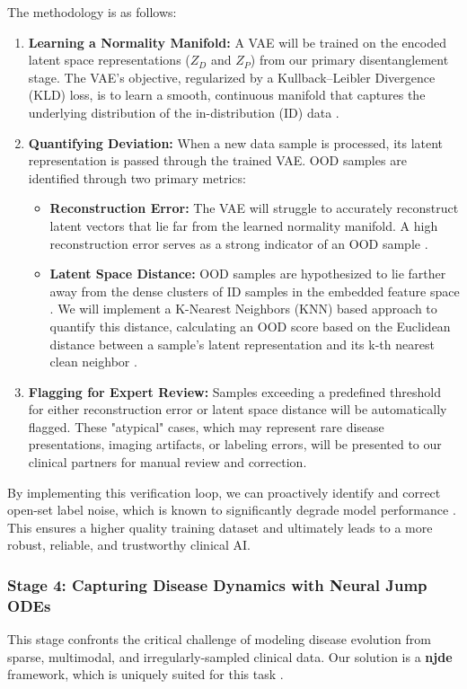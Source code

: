 \documentclass[11pt, a4paper]{article}
\begin{document}
The methodology is as follows:
\begin{enumerate}
    \item \textbf{Learning a Normality Manifold:} A VAE will be trained on the encoded latent space representations ($Z_D$ and $Z_P$) from our primary disentanglement stage. The VAE's objective, regularized by a Kullback–Leibler Divergence (KLD) loss, is to learn a smooth, continuous manifold that captures the underlying distribution of the in-distribution (ID) data \cite{YuanStojanovski2025,ZhouZhou2025}.
    \item \textbf{Quantifying Deviation:} When a new data sample is processed, its latent representation is passed through the trained VAE. OOD samples are identified through two primary metrics:
    \begin{itemize}
        \item \textbf{Reconstruction Error:} The VAE will struggle to accurately reconstruct latent vectors that lie far from the learned normality manifold. A high reconstruction error serves as a strong indicator of an OOD sample \cite{BiHuang2025,ZhangGe2025}.
        \item \textbf{Latent Space Distance:} OOD samples are hypothesized to lie farther away from the dense clusters of ID samples in the embedded feature space \cite{LiaoHu2025}. We will implement a K-Nearest Neighbors (KNN) based approach to quantify this distance, calculating an OOD score based on the Euclidean distance between a sample's latent representation and its k-th nearest clean neighbor \cite{ZhangGe2025,LiaoHu2025}.
    \end{itemize}
    \item \textbf{Flagging for Expert Review:} Samples exceeding a predefined threshold for either reconstruction error or latent space distance will be automatically flagged. These "atypical" cases, which may represent rare disease presentations, imaging artifacts, or labeling errors, will be presented to our clinical partners for manual review and correction.
\end{enumerate}
By implementing this verification loop, we can proactively identify and correct open-set label noise, which is known to significantly degrade model performance \cite{LiaoHu2025}.  This ensures a higher quality training dataset and ultimately leads to a more robust, reliable, and trustworthy clinical AI.

\subsubsection{Stage 4: Capturing Disease Dynamics with Neural Jump ODEs}
This stage confronts the critical challenge of modeling disease evolution from sparse, multimodal, and irregularly-sampled clinical data. Our solution is a \textbf{\gls{njde}} framework, which is uniquely suited for this task \cite{GwakSim2020}.
\end{document}
